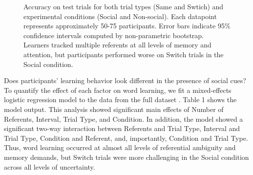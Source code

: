 \documentclass[man]{apa2}
\begin{document}
%
\begin{figure}[H]
	\centering
	\caption{Accuracy on test trials for both trial types (Same and Swtich) and experimental conditions (Social and Non-social). Each datapoint represents approximately 50-75 participants. Error bars indicate 95\% confidence intervals computed by non-parametric bootstrap. Learners tracked multiple referents at all levels of memory and attention, but participants performed worse on Switch trials in the Social condition.}
\end{figure}
%

Does participants' learning behavior look different in the presence of social cues? To quantify the effect of each factor on word learning, we fit a mixed-effects logistic regression model to the data from the full dataset \cite{baayen2008mixed}. Table 1 shows the model output. This analysis showed significant main effects of Number of Referents, Interval, Trial Type, and Condition. In addition, the model showed a significant two-way interaction between Referents and Trial Type, Interval and Trial Type, Condition and Referent, and, importantly, Condition and Trial Type. Thus, word learning occurred at almost all levels of referential ambiguity and memory demands, but Switch trials were more challenging in the Social condition across all levels of uncertainty. 
\end{document}
